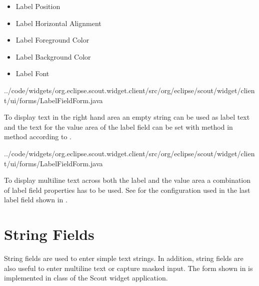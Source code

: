 \documentclass[a4paper,10pt,twoside]{book}
\begin{document}
\begin{itemize}
  \item Label Position
  \item Label Horizontal Alignment
  \item Label Foreground Color
  \item Label Background Color
  \item Label Font
\end{itemize}


{../code/widgets/org.eclipse.scout.widget.client/src/org/eclipse/scout/widget/client/ui/forms/LabelFieldForm.java}

To display text in the right hand area an empty string can be used as label text and the text for the value area of the label field can be set with method  in method  according to .


{../code/widgets/org.eclipse.scout.widget.client/src/org/eclipse/scout/widget/client/ui/forms/LabelFieldForm.java}

To display multiline text across both the label and the value area a combination of label field properties has to be used.
See  for the configuration used in the last label field shown in .

\section{String Fields}

String fields are used to enter simple text strings. 
In addition, string fields are also useful to enter multiline text or capture masked input.
The form shown in  is implemented in class  of the Scout widget application.
\end{document}
